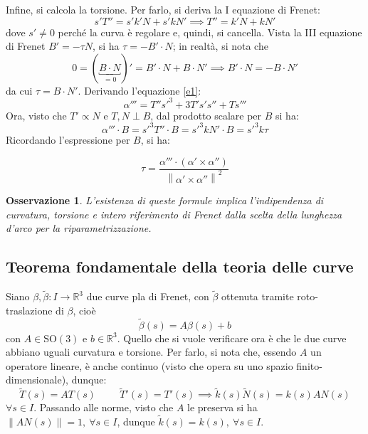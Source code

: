 \documentclass[12pt]{article}
\theoremstyle{style}
\newtheorem{osservazione}{Osservazione}[section]
\newenvironment{boxenv}[1][]{
    \begin{eqbox}[#1]
    }{
   \end{eqbox}
}
\numberwithin{equation}{subsection}
\begin{document}
\noindent Infine, si calcola la torsione. 
Per farlo, si deriva la I equazione di Frenet:
\[
s'T'' = s'k'N + s'k N'  \implies T'' = k'N + kN'
\] 
dove $s' \neq 0$ perch\'e la curva \`e regolare e, quindi, si cancella.
Vista la III equazione di Frenet $B'  = -\tau N $, si ha $\tau  = - B' \cdot N$; in realt\`a, si nota che
\[
	0=(\underbracket{B\cdot N}_{=0} )'= B' \cdot N + B \cdot N'\implies B' \cdot N = - B\cdot N'
\] 
da cui $\tau  = B \cdot N'$.
Derivando l'equazione \ref{e1}:
\[
\alpha '''= T'' s'^3 + 3T's's'' + Ts''' 
\] 
Ora, visto che $T' \propto N$ e $T,N \perp B$, dal prodotto scalare per $B$ si ha:
\[
\alpha ''' \cdot B = s'^3T '' \cdot B = s'^3k N' \cdot B= s'^3 k \tau 
\] 
Ricordando l'espressione per $B$, si ha:
\begin{boxenv}[]
\[
\tau = \frac{\alpha ''' \cdot (\alpha ' \times \alpha '')}{\left\lVert \alpha ' \times \alpha '' \right\rVert ^2 } 
\] 
\end{boxenv}
\begin{osservazione}
L'esistenza di queste formule implica l'indipendenza di curvatura, torsione e intero riferimento di Frenet dalla scelta della lunghezza d'arco per la riparametrizzazione.
\end{osservazione}
\subsection{Teorema fondamentale della teoria delle curve}
Siano $\beta , \widetilde{\beta }:I\to \mathbb{R}^3$ due curve pla di Frenet, con $\widetilde{\beta }$ ottenuta tramite roto-traslazione di $\beta $, cio\`e
\[
\widetilde{\beta }(s) = A \beta (s) + b
\] 
con $A \in \mathrm{SO} (3)$ e $b \in \mathbb{R}^3$.
Quello che si vuole verificare ora \`e che le due curve abbiano uguali curvatura e torsione.
Per farlo, si nota che, essendo $A$ un operatore lineare, \`e anche continuo (visto che opera su uno spazio finito-dimensionale), dunque:
\[
\widetilde{T}(s) = A T(s)  \hspace{1cm} \widetilde{T}' (s) = T'(s) \implies \widetilde{k}(s) \widetilde{N}(s) = k(s) A N(s)
\] 
$\forall s \in I $.
Passando alle norme, visto che $A$ le preserva si ha $\left\lVert A N(s) \right\rVert = 1, \ \forall s \in I $, dunque $\widetilde{k}(s) = k(s), \ \forall s \in I$.
\end{document}
